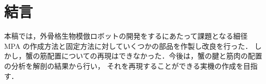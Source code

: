 \documentclass{jarticle}
\begin{document}
\vspace*{-2mm}
\section{結言}

本稿では，外骨格生物模倣ロボットの開発をするにあたって課題となる細径MPA の作成方法と固定方法に対していくつかの部品を作製し改良を行った．
しかし，蟹の筋配置についての再現はできなかった．今後は，蟹の腱と筋肉の配置の分析を解剖の結果から行い，
それを再現することができる実機の作成を目指す．






\end{document}
